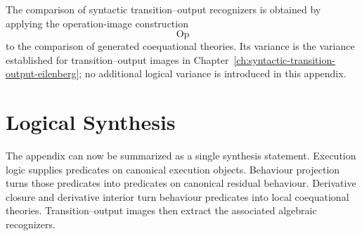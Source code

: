 \begin{remark}
\label{rem:recognizer-variance}
The comparison of syntactic transition--output recognizers is obtained by
applying the operation-image construction
\[
  \operatorname{Op}
\]
to the comparison of generated coequational theories.  Its variance is the
variance established for transition--output images in
Chapter~\ref{ch:syntactic-transition-output-eilenberg}; no additional logical
variance is introduced in this appendix.
\end{remark}

\section{Logical Synthesis}
\label{sec:logical-synthesis-formal}

The appendix can now be summarized as a single synthesis statement.  Execution
logic supplies predicates on canonical execution objects.  Behaviour
projection turns those predicates into predicates on canonical residual
behaviour.  Derivative closure and derivative interior turn behaviour
predicates into local coequational theories.  Transition--output images then
extract the associated algebraic recognizers.

